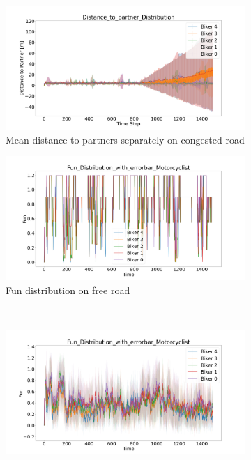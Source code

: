 \begin{figure}[H]
    \centering
    \begin{subfigure}[b]{0.45\textwidth}
       \centering
        \includegraphics[width=1.0\textwidth]{images/Rippoldsauer/Rippoldsauer_Distance_to_partner_distribution_congested.png}
        \caption{Mean distance to partners separately on congested road}
    \end{subfigure}
    \hfill
    \begin{subfigure}[b]{0.45\textwidth}
        \centering
        \includegraphics[width=1.0\textwidth]{images/Rippoldsauer/Rippoldsauer_Fun_Distribution_with_errorbar_free.png}
        \caption{Fun distribution on free road}
    \end{subfigure}
    \\
    \begin{subfigure}[b]{0.45\textwidth}
        \centering
        \includegraphics[width=1.0\textwidth]{images/Rippoldsauer/Rippoldsauer_Fun_Distribution_with_errorbar_congested.png}

\end{subfigure}
\end{figure}
